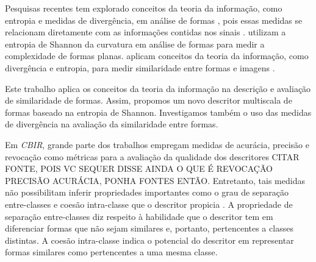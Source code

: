 Pesquisas recentes \cite{Principe:2014,Zang:2014} tem explorado conceitos da teoria da informação, como entropia e medidas de divergência, em análise de formas \cite{Escolano:2009}, pois essas medidas se relacionam diretamente com as informações contidas nos sinais \cite{Principe:2011}.  utilizam a entropia de Shannon da curvatura em análise de formas para medir a complexidade de formas planas.  aplicam conceitos da teoria da informação, como divergência e entropia, para medir similaridade entre formas e imagens \cite{Principe:2014,Zang:2014}.

Este trabalho aplica os conceitos da teoria da informação na descrição e avaliação de similaridade de formas. Assim, propomos um novo descritor multiscala de formas baseado na entropia de Shannon.  Investigamos também o uso das medidas de divergência na avaliação da similaridade entre formas. 





Em \emph{CBIR}, grande parte dos trabalhos empregam medidas de acurácia, precisão e revocação como métricas para a avaliação da qualidade dos descritores {\color{red} CITAR FONTE, POIS VC SEQUER DISSE AINDA O QUE É REVOCAÇÃO PRECISÃO ACURÁCIA, PONHA FONTES ENTÃO}. Entretanto, tais medidas não possibilitam inferir propriedades importantes como o grau de separação entre-classes e coesão intra-classe que o descritor propicia \cite{Meta:2009}. A propriedade de separação entre-classes diz respeito à habilidade que o descritor tem em diferenciar formas que não sejam similares e, portanto, pertencentes a classes distintas. A coesão intra-classe indica o potencial do descritor em representar formas similares como pertencentes a uma mesma classe.  

